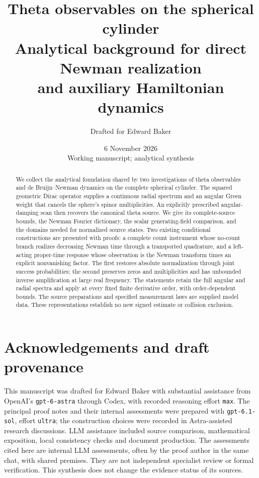 \documentclass[11pt]{article}
\title{Theta observables on the spherical cylinder\\[3pt]
\large Analytical background for direct Newman realization\\
and auxiliary Hamiltonian dynamics}
\author{Drafted for Edward Baker}
\date{6 November 2026\\\small Working manuscript; analytical synthesis}
\theoremstyle{remark}
\numberwithin{equation}{section}
\begin{document}
\maketitle
\begin{abstract}
We collect the analytical foundation shared by two investigations of theta
observables and de Bruijn--Newman dynamics on the complete spherical cylinder.
The squared geometric Dirac operator supplies a continuous radial spectrum
and an angular Green weight that cancels the sphere's spinor multiplicities.
An explicitly prescribed angular-damping scan then recovers the canonical
theta source. We give its complete-source bounds, the Newman Fourier
dictionary, the scalar generating-field comparison, and the domains needed
for normalized source states. Two existing conditional constructions are
presented with proofs: a complete count instrument whose no-count branch
realizes decreasing Newman time through a transported quadrature, and a
left-acting proper-time response whose observation is the Newman transform
times an explicit nonvanishing factor. The first restores absolute
normalization through joint success probabilities; the second preserves
zeros and multiplicities and has unbounded inverse amplification at large
real frequency. The statements retain the full angular and radial spectra
and apply at every fixed finite derivative order, with order-dependent
bounds. The source preparations and specified measurement laws are supplied
model data. These representations establish no new signed estimate or
collision exclusion.
\end{abstract}
\tableofcontents
\clearpage







\section*{Acknowledgements and draft provenance}
This manuscript was drafted for Edward Baker with substantial assistance
from OpenAI's \texttt{gpt-6-astra} through Codex, with recorded reasoning
effort \texttt{max}. The principal proof notes and their internal assessments
were prepared with \texttt{gpt-6.1-sol}, effort \texttt{ultra}; the construction
choices were recorded in Astra-assisted research discussions. LLM assistance
included source comparison, mathematical exposition, local consistency
checks and document production. The assessments cited here are internal
LLM assessments, often by the proof author in the same chat, with shared
premises. They are not independent specialist review or formal verification.
This synthesis does not change the evidence status of its sources.

\begingroup
\small


\endgroup
\end{document}
